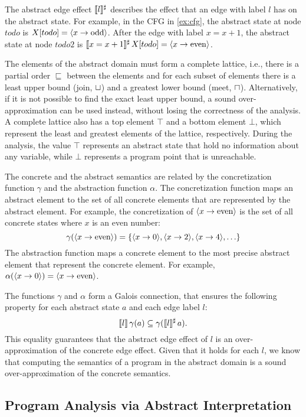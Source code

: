 The abstract edge effect $\llbracket l\rrbracket^\sharp$ describes the effect that an edge with label $l$ has on the abstract state.
For example, in the CFG in \cref{ex:cfg}, the abstract state at node $todo$ is $X[todo] = \langle x \rightarrow \text{odd}\rangle$.
After the edge with label $x = x+1$, the abstract state at node $todo2$ is $\llbracket x = x+1\rrbracket^\sharp\,X[todo] = \langle x \rightarrow \text{even}\rangle$.

The elements of the abstract domain must form a complete lattice, i.e., there is a partial order $\sqsubseteq$ between the elements and for each subset of elements there is a least upper bound (join, $\sqcup$) and a greatest lower bound (meet, $\sqcap$).
Alternatively, if it is not possible to find the exact least upper bound, a sound over-approximation
can be used instead, without losing the correctness of the analysis.
A complete lattice also has a top element $\top$ and a bottom element $\bot$, which represent the least and greatest elements of the lattice, respectively.
During the analysis, the value $\top$ represents an abstract state that hold no information
about any variable, while $\bot$ represents a program point that is unreachable.

The concrete and the abstract semantics are related by the concretization function $\gamma$ and the abstraction function $\alpha$.
The concretization function maps an abstract element to the set of all concrete elements that are represented by the abstract element.
For example, the concretization of $\langle x \rightarrow \text{even}\rangle$ is the set of all concrete states where $x$ is an even number:
\[
\gamma(\langle x \rightarrow \text{even}\rangle) = \{\langle x \rightarrow 0\rangle, \langle x \rightarrow 2\rangle, \langle x \rightarrow 4\rangle,\ldots\}
\]
The abstraction function maps a concrete element to the most precise abstract element that represent the concrete element. For example, $\alpha(\langle x \rightarrow 0\rangle) = \langle x \rightarrow \text{even}\rangle$.

The functions $\gamma$ and $\alpha$ form a Galois connection, that ensures the following property for each abstract state $a$ and each edge label $l$:
\[
\llbracket l\rrbracket\,\gamma(a) \subseteq \gamma(\llbracket l\rrbracket^\sharp\,a).
\]
This equality guarantees that the abstract edge effect of $l$ is an over-approximation
of the concrete edge effect.
Given that it holds for each $l$, we know that computing the semantics of a program in the abstract domain is a sound
over-approximation of the concrete semantics.

\subsection{Program Analysis via Abstract Interpretation}

